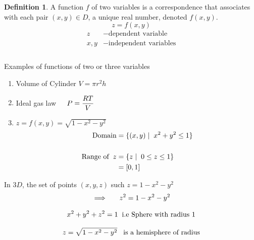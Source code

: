 \documentclass[11pt,a4paper]{article}
\theoremstyle{definition}
\newtheorem{defn}[thm]{Definition}
\begin{document}
\begin{defn}


A function $f$ of two variables is a correspondence that associates with each pair $(x,y)\in D$, a unique real number, denoted $f(x,y)$. $$z = f(x,y)$$
\begin{align*}
z & - \text{dependent variable}\\
x,y & - \text{independent variables}\\\\
\end{align*}

Examples of functions of two or three variables
\begin{enumerate}
\item[$-$] Volume of Cylinder $\displaystyle{V = \pi r^2 h}$

\item[$-$] Ideal gas law $\hspace{0.4cm}\displaystyle{P = \frac{RT}{V}}$

\item[$-$] $z = f(x,y) = \sqrt{1 - x^2 - y^2}$
\begin{align*}
\text{Domain} & = \{(x,y)\hspace{0.1cm}|\hspace{0.2cm} x^2 + y^2 \leq 1\}\\\\
\text{Range of}\hspace{0.2cm} z & = \{z\hspace{0.1cm}|\hspace{0.2cm} 0\leq z \leq 1\}\\
                  & = [0,1]\\
\end{align*}
\end{enumerate}

In $3D$, the set of points $(x,y,z)$ such $z = 1 - x^2 - y^2$
$$\implies \hspace{0.5cm} z^2 = 1 - x^2 - y^2$$

$$ x^2 + y^2 + z^2 = 1 \hspace{0.2cm}\text{i.e Sphere with radius 1}$$

$$z = \sqrt{1 - x^2 - y^2}\hspace{0.3cm}\text{is a hemisphere of radius}$$



\end{defn}
\end{document}
